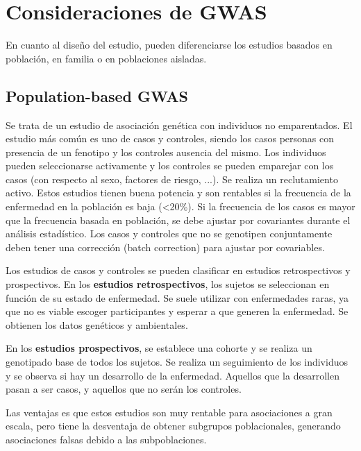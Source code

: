\section{Consideraciones de GWAS}
En cuanto al diseño del estudio, pueden diferenciarse los estudios basados en población, en familia o en poblaciones aisladas.

\subsection{Population-based GWAS}
Se trata de un estudio de asociación genética con individuos no emparentados. El estudio más común es uno de casos y controles, siendo los casos personas con presencia de un fenotipo y los controles ausencia del mismo. Los individuos pueden seleccionarse activamente y los controles se pueden emparejar con los casos (con respecto al sexo, factores de riesgo, ...). Se realiza un reclutamiento activo. Estos estudios tienen buena potencia y son rentables si la frecuencia de la enfermedad en la población es baja (<20\%). Si la frecuencia de los casos es mayor que la frecuencia basada en población, se debe ajustar por covariantes durante el análisis estadístico. Los casos y controles que no se genotipen conjuntamente deben tener una corrección (batch correction) para ajustar por covariables.

Los estudios de casos y controles se pueden clasificar en estudios retrospectivos y prospectivos. En los \textbf{estudios retrospectivos}, los sujetos se seleccionan en función de su estado de enfermedad. Se suele utilizar con enfermedades raras, ya que no es viable escoger participantes y esperar a que generen la enfermedad. Se obtienen los datos genéticos y ambientales.

En los \textbf{estudios prospectivos}, se establece una cohorte y se realiza un genotipado base de todos los sujetos. Se realiza un seguimiento de los individuos y se observa si hay un desarrollo de la enfermedad. Aquellos que la desarrollen pasan a ser casos, y aquellos que no serán los controles. 

Las ventajas es que estos estudios son muy rentable para asociaciones a gran escala, pero tiene la desventaja de obtener subgrupos poblacionales, generando asociaciones falsas debido a las subpoblaciones.

